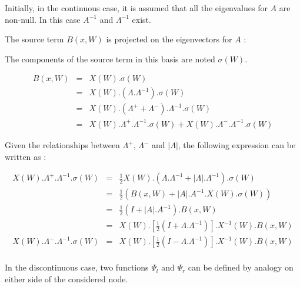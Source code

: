 Initially, in the continuous case, it is assumed that all the eigenvalues for $A$ are non-null. In this case $A^{-1}$ and $\Lambda^{-1}$ exist.

\vspace{0.5cm}

The source term $B(x,W)$ is projected on the eigenvectors for $A$ :

\vspace{0.5cm}

The components of the source term in this basis are noted $\sigma(W)$.

\begin{eqnarray}
 B(x,W) & = & X(W).\sigma(W) \nonumber \\
        & = & X(W).\left ( \Lambda . \Lambda^{-1} \right ).\sigma(W) \nonumber \\
        & = & X(W).\left ( \Lambda^+  + \Lambda^- \right ). \Lambda^{-1} .\sigma(W) \nonumber \\
        & = & X(W).\Lambda^+.\Lambda^{-1}.\sigma(W) + X(W).\Lambda^-.\Lambda^{-1}.\sigma(W)
\end{eqnarray}

\vspace{0.5cm}

Given the relationships between $\Lambda^+$, $\Lambda^-$ and $|\Lambda|$, the following expression can be written as :

\begin{eqnarray}
 X(W).\Lambda^+.\Lambda^{-1}.\sigma(W) & = & \frac{1}{2} X(W).\left ( \Lambda.\Lambda^{-1}+|\Lambda|.\Lambda^{-1}\right ) . \sigma(W) \nonumber \\
                                       & = & \frac{1}{2} \left ( B(x,W) + |A|.A^{-1}.X(W).\sigma(W) \right ) \nonumber \\
                                       & = & \frac{1}{2} \left ( I + |A|.A^{-1} \right ).B(x,W) \nonumber \\
                                       & = & X(W) . \left [ \frac{1}{2} \left ( I + \Lambda . \Lambda^{-1} \right ) \right ] . X^{-1}(W).B(x,W) \nonumber \\
 X(W).\Lambda^-.\Lambda^{-1}.\sigma(W) & = & X(W) . \left [ \frac{1}{2} \left ( I - \Lambda . \Lambda^{-1} \right ) \right ] . X^{-1}(W).B(x,W) \nonumber \\
\end{eqnarray}

\vspace{0.5cm}

In the discontinuous case, two functions $\Psi_l$ and $\Psi_r$ can be defined by analogy on either side of the considered node.

